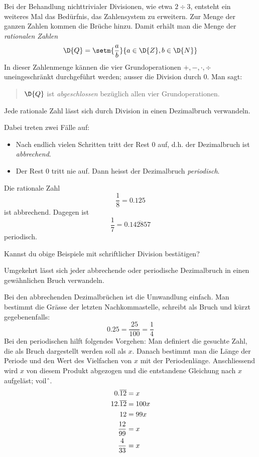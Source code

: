 \documentclass[%
11pt,%
twoside,%
titlepage,%
german,%
]{scrartcl}
\begin{document}
Bei der Behandlung nichttrivialer Divisionen, wie etwa $2\div3$, entsteht ein weiteres Mal das Bed\"urfnis, das Zahlensystem zu erweitern. Zur Menge der ganzen Zahlen kommen die Br\"uche hinzu. Damit erh\"alt man die Menge der \emph{rationalen Zahlen}
$$\D{Q}=\setm{\frac{a}{b}}{a\in\D{Z}, b\in\D{N}}$$
In dieser Zahlenmenge k\"annen die vier Grundoperationen $+,-,\cdot,\div$ uneingeschr\"ankt durchgef\"uhrt werden; ausser die Division durch $0$. Man sagt:
\begin{quote}
$\D{Q}$ ist \emph{abgeschlossen} bez\"uglich allen vier Grundoperationen.
\end{quote}

\begin{bem}
Jede rationale Zahl l\"asst sich durch Division in einen Dezimalbruch verwandeln.
\end{bem}
Dabei treten zwei F\"alle auf:
\begin{itemize}
\item Nach endlich vielen Schritten tritt der Rest $0$ auf, d.h. der Dezimalbruch ist \emph{abbrechend}.
\item Der Rest $0$ tritt nie auf. Dann heisst der Dezimalbruch \emph{periodisch}.
\end{itemize}
\begin{bsps}
Die rationale Zahl
$$\frac{1}{8}=0.125$$
ist abbrechend. Dagegen ist
$$\frac{1}{7}=0.\overline{142857}$$
periodisch.
\end{bsps}
\begin{frage}
Kannst du obige Beispiele mit schriftlicher Division best\"atigen?
\end{frage}

\begin{bem}
Umgekehrt l\"asst sich jeder abbrechende oder periodische Dezimalbruch in einen gew\"ahnlichen Bruch verwandeln.
\end{bem}

\begin{bsp}
Bei den abbrechenden Dezimalbr\"uchen ist die Umwandlung einfach. Man bestimmt die Gr\"asse der letzten Nachkommastelle, schreibt als Bruch und k\"urzt gegebenenfalls:
$$0.25=\frac{25}{100}=\frac{1}{4}$$
Bei den periodischen hilft folgendes Vorgehen: Man definiert die gesuchte Zahl, die als Bruch dargestellt werden soll als $x$. Danach bestimmt man die L\"ange der Periode und den Wert des Vielfachen von $x$ mit der Periodenl\"ange. Anschliessend wird $x$ von diesem Produkt abgezogen und die entstandene Gleichung nach $x$ aufgel\"ast; voilˆ.
\begin{align}
0.\overline{12}&=x \notag\\ \notag
12.\overline{12}&=100x\\ \notag
12&=99x\\ \notag
\frac{12}{99}&=x\\ \notag
\frac{4}{33}&=x
\end{align}
\end{bsp}
\end{document}
